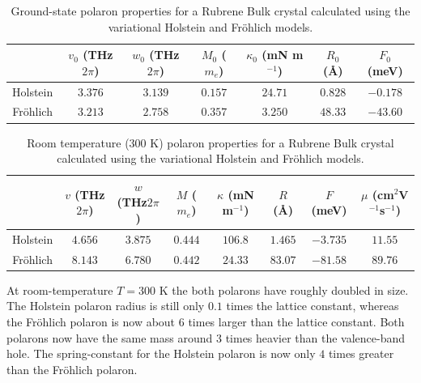 \begin{table}
    \centering
    \begin{tabular}{|c|c|c|c|c|c|c|}
    \hline
        & $v_0$ (THz$2\pi$) & $w_0$ (THz$2\pi$) & $M_0$ ($m_e$) &  $\kappa_0$ (mN m$^{-1}$) & $R_0$ (Å) & $F_0$ (meV) \\
    \hline
         Holstein & $3.376$ & $3.139$ & $0.157$ & $24.71$ & $0.828$ & $-0.178$ \\
    \hline
         Fr\"ohlich & $3.213$ & $2.758$ & $0.357$ & $3.250$ & $48.33$ & $-43.60$ \\
    \hline
    \end{tabular}
    \caption{Ground-state polaron properties for a Rubrene Bulk crystal calculated using the variational Holstein and Fr\"ohlich models.}
    \label{tab:rubrenegs}
\end{table}

\begin{table}
    \centering
    \begin{tabular}{|c|c|c|c|c|c|c|c|}
    \hline
        & $v$ (THz$2\pi$) & $w$ (THz$2\pi$) & $M$ ($m_e$) &  $\kappa$ (mN m$^{-1}$) & $R$ (Å) & $F$ (meV) & $\mu$ (cm$^2$V$^{-1}$s$^{-1}$) \\
    \hline
         Holstein & $4.656$ & $3.875$ & $0.444$ & $106.8$ & $1.465$ & $-3.735$ & $11.55$ \\
    \hline
        Fr\"ohlich & $8.143$ & $6.780$ & $0.442$ & $24.33$ & $83.07$ & $-81.58$ & $89.76$ \\
    \hline
    \end{tabular}
    \caption{Room temperature ($300$ K) polaron properties for a Rubrene Bulk crystal calculated using the variational Holstein and Fr\"ohlich models.}
    \label{tab:rubrenert}
\end{table}

At room-temperature $T = 300$ K the both polarons have roughly doubled in size. The Holstein polaron radius is still only $0.1$ times the lattice constant, whereas the Fr\"ohlich polaron is now about $6$ times larger than the lattice constant. Both polarons now have the same mass around $3$ times heavier than the valence-band hole. The spring-constant for the Holstein polaron is now only $4$ times greater than the Fr\"ohlich polaron.
\newline

